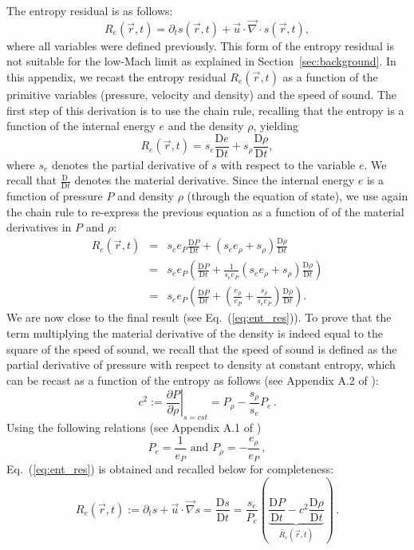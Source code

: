 \documentclass[preprint,10pt]{elsarticle}
\renewcommand{\div}{\vec{\nabla}\! \cdot \!}
\newcommand{\grad}{\vec{\nabla}}
\newcommand{\resi}{R_e}
\newcommand{\resinew}{\widetilde{\resi}}
\newcommand{\matder}[1]{\frac{\textrm{D} #1}{\textrm{D} t}}
\newcommand{\eqt}[1]{Eq.~(\ref{#1})}                     %
\newcommand{\sct}[1]{Section~\ref{#1}}                   %
\begin{document}
The entropy residual is as follows:
%
\begin{equation*}
\resi(\vec{r},t) = \partial_t s (\vec{r},t) + \vec{u} \cdot \div s (\vec{r},t) ,
\end{equation*}
%
where all variables were defined previously. This form of the entropy residual is not suitable for the low-Mach limit as explained in \sct{sec:background}. In this appendix, we recast the entropy residual $\resi(\vec{r},t)$ as a function of the primitive variables (pressure, velocity and density) and the speed of sound. The first step of this derivation is to use the chain rule, recalling that the entropy is a function of the internal energy $e$ and the density $\rho$, yielding
%
\begin{equation*}
\resi(\vec{r},t) = s_e  \matder{e} + s_{\rho}  \matder{\rho} ,
\end{equation*}
%
where $s_e$ denotes the partial derivative of $s$ with respect to the variable $e$. We recall that $\matder{\ }$ denotes the material derivative. Since the internal energy $e$ is a function of pressure $P$ and density $\rho$ (through the equation of state), we use again the chain rule to re-express the previous equation as a function of of the material derivatives in $P$ and $\rho$:
%
\begin{eqnarray*}
\resi(\vec{r},t) &=&  s_e e_P \matder{P} + ( s_e e_{\rho} + s_{\rho} ) \matder{\rho} \\
&=& s_e e_P \left( \matder{P} + \frac{1}{s_e e_P} ( s_e e_{\rho} + s_{\rho} )  \matder{\rho}\right) \\
&=& s_e e_P \left( \matder{P} + ( \frac{e_{\rho}}{e_P} + \frac{s_{\rho}}{s_e e_P} )  \matder{\rho} \right) .
\end{eqnarray*}
%
We are now close to the final result (see \eqt{eq:ent_res}). To prove that the term multiplying the material derivative of the density is indeed equal to the square of the speed of sound, we recall that the speed of sound is defined as the partial derivative of pressure with respect to density at constant entropy, which can be recast as a function of the entropy as follows (see Appendix A.2 of \cite{jlg}):
%
\begin{equation*}
c^2 := \left. \frac{\partial P}{\partial \rho} \right|_{s=cst} = P_{\rho} - \frac{s_{\rho}}{s_e} P_e   \, .
\end{equation*}
%
Using the following relations (see Appendix A.1 of \cite{jlg})
%
\begin{equation*}
P_e = \frac{1}{e_P} \text{ and } P_{\rho} = -\frac{e_{\rho}}{e_P}  \, ,
\end{equation*}
%
\eqt{eq:ent_res} is obtained and recalled below for completeness:
%
\begin{equation*}
\resi(\vec{r},t) := \partial_t s + \vec{u} \cdot \grad s = \matder{s} = \frac{s_e}{P_e} \left( \underbrace{\matder{P} - c^2 \matder{\rho} }_{\resinew(\vec{r},t)} \right) \, .
\end{equation*} 
\end{document}
